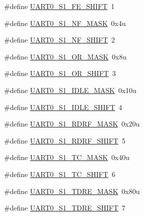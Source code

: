 \begin{DoxyCompactItemize}
\item 
\#define \hyperlink{group___u_a_r_t0___register___masks_ga7875ba67c717eabba8e99c077b3ed956}{U\+A\+R\+T0\+\_\+\+S1\+\_\+\+F\+E\+\_\+\+S\+H\+I\+FT}~1
\item 
\#define \hyperlink{group___u_a_r_t0___register___masks_ga8d428cf6cbd42d46556eb94a1ba90c96}{U\+A\+R\+T0\+\_\+\+S1\+\_\+\+N\+F\+\_\+\+M\+A\+SK}~0x4u
\item 
\#define \hyperlink{group___u_a_r_t0___register___masks_ga345c1c8f761fe45de1be741a581f298b}{U\+A\+R\+T0\+\_\+\+S1\+\_\+\+N\+F\+\_\+\+S\+H\+I\+FT}~2
\item 
\#define \hyperlink{group___u_a_r_t0___register___masks_gafe263b65f56ebb135d82f6f380d92503}{U\+A\+R\+T0\+\_\+\+S1\+\_\+\+O\+R\+\_\+\+M\+A\+SK}~0x8u
\item 
\#define \hyperlink{group___u_a_r_t0___register___masks_ga30b721ac10d936a50f083dd8edf63793}{U\+A\+R\+T0\+\_\+\+S1\+\_\+\+O\+R\+\_\+\+S\+H\+I\+FT}~3
\item 
\#define \hyperlink{group___u_a_r_t0___register___masks_gab6f26cdc2089161970bbd6d77daf345b}{U\+A\+R\+T0\+\_\+\+S1\+\_\+\+I\+D\+L\+E\+\_\+\+M\+A\+SK}~0x10u
\item 
\#define \hyperlink{group___u_a_r_t0___register___masks_gac68bfcf79c38331eb53678c7578e5937}{U\+A\+R\+T0\+\_\+\+S1\+\_\+\+I\+D\+L\+E\+\_\+\+S\+H\+I\+FT}~4
\item 
\#define \hyperlink{group___u_a_r_t0___register___masks_gabfc8c446e35e26275bc966d2a9c50115}{U\+A\+R\+T0\+\_\+\+S1\+\_\+\+R\+D\+R\+F\+\_\+\+M\+A\+SK}~0x20u
\item 
\#define \hyperlink{group___u_a_r_t0___register___masks_ga64f8830cd7e5c3c69d91f4747137f323}{U\+A\+R\+T0\+\_\+\+S1\+\_\+\+R\+D\+R\+F\+\_\+\+S\+H\+I\+FT}~5
\item 
\#define \hyperlink{group___u_a_r_t0___register___masks_ga0d63e21fc62457b6a441c82d0ed21980}{U\+A\+R\+T0\+\_\+\+S1\+\_\+\+T\+C\+\_\+\+M\+A\+SK}~0x40u
\item 
\#define \hyperlink{group___u_a_r_t0___register___masks_ga00448db2843a19047ebd7ae86f2cb1fd}{U\+A\+R\+T0\+\_\+\+S1\+\_\+\+T\+C\+\_\+\+S\+H\+I\+FT}~6
\item 
\#define \hyperlink{group___u_a_r_t0___register___masks_ga54aac82fa657a6a49064908004abc80d}{U\+A\+R\+T0\+\_\+\+S1\+\_\+\+T\+D\+R\+E\+\_\+\+M\+A\+SK}~0x80u
\item 
\#define \hyperlink{group___u_a_r_t0___register___masks_gaf1ba1833eeb3d207610024627260a23a}{U\+A\+R\+T0\+\_\+\+S1\+\_\+\+T\+D\+R\+E\+\_\+\+S\+H\+I\+FT}~7
\item 

\end{DoxyCompactItemize}
